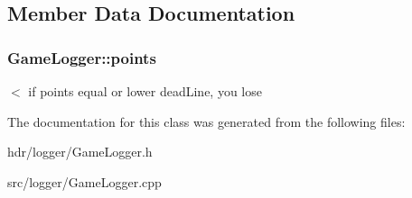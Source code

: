 \subsection{Member Data Documentation}
\subsubsection[{points}]{ Game\-Logger\-::points}\label{class_game_logger_a55b51a277a00b08d8bbf68fe20fb8118}
$<$ if points equal or lower dead\-Line, you lose 

The documentation for this class was generated from the following files\-:\begin{DoxyCompactItemize}
\item 
hdr/logger/Game\-Logger.\-h\item 
src/logger/Game\-Logger.\-cpp\end{DoxyCompactItemize}

